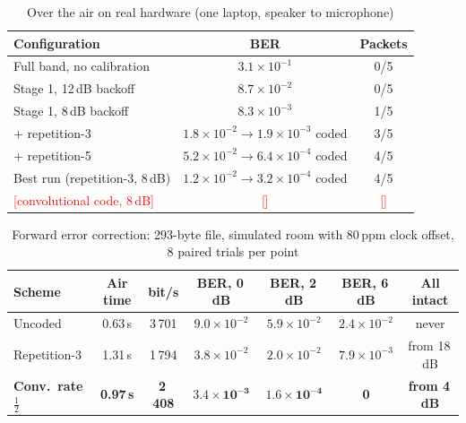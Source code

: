 \documentclass[11pt,a4paper]{report}
\newcommand{\fillin}[1]{\textcolor{red}{[#1]}}
\begin{document}
\begin{table}[htbp]
\centering
\small
\begin{tabular}{|l|c|c|}
\hline
\textbf{Configuration} & \textbf{BER} & \textbf{Packets} \\
\hline
Full band, no calibration & $3.1\times10^{-1}$ & 0/5 \\
Stage 1, 12\,dB backoff & $8.7\times10^{-2}$ & 0/5 \\
Stage 1, 8\,dB backoff & $8.3\times10^{-3}$ & 1/5 \\
+ repetition-3 & $1.8\times10^{-2}\rightarrow1.9\times10^{-3}$ coded & 3/5 \\
+ repetition-5 & $5.2\times10^{-2}\rightarrow6.4\times10^{-4}$ coded & 4/5 \\
Best run (repetition-3, 8\,dB) & $1.2\times10^{-2}\rightarrow3.2\times10^{-4}$ coded & 4/5 \\
\fillin{convolutional code, 8\,dB} & \fillin{} & \fillin{} \\
\hline
\end{tabular}
\caption{Over the air on real hardware (one laptop, speaker to microphone)}
\end{table}

\label{sec:fec}
\begin{table}[htbp]
\centering
\footnotesize
\begin{tabular}{|l|c|c|c|c|c|c|}
\hline
\textbf{Scheme} & \textbf{Air time} & \textbf{bit/s} & \textbf{BER, 0\,dB} & \textbf{BER, 2\,dB} & \textbf{BER, 6\,dB} & \textbf{All intact} \\
\hline
Uncoded & 0.63\,s & 3\,701 & $9.0\times10^{-2}$ & $5.9\times10^{-2}$ & $2.4\times10^{-2}$ & never \\
Repetition-3 & 1.31\,s & 1\,794 & $3.8\times10^{-2}$ & $2.0\times10^{-2}$ & $7.9\times10^{-3}$ & from 18\,dB \\
\textbf{Conv.\ rate $\tfrac12$} & \textbf{0.97\,s} & \textbf{2\,408} & $\mathbf{3.4\times10^{-3}}$ & $\mathbf{1.6\times10^{-4}}$ & \textbf{0} & \textbf{from 4\,dB} \\
\hline
\end{tabular}
\caption{Forward error correction: 293-byte file, simulated room with 80\,ppm clock
offset, 8 paired trials per point}
\end{table}
\end{document}
